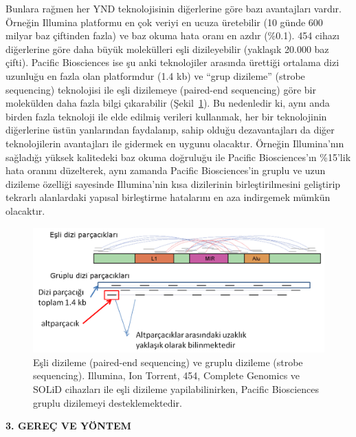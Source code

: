 \documentclass[11pt]{article}
\begin{document}
Bunlara rağmen her YND teknolojisinin diğerlerine göre bazı avantajları vardır. Örneğin Illumina platformu en çok veriyi en ucuza üretebilir (10 günde 600 milyar baz çiftinden fazla) ve baz okuma hata oranı en azdır (\%0.1). 454 cihazı diğerlerine göre daha büyük molekülleri eşli dizileyebilir (yaklaşık 20.000 baz çifti). Pacific Biosciences ise şu anki teknolojiler arasında ürettiği ortalama dizi uzunluğu en fazla olan platformdur (1.4 kb) ve ``grup dizileme'' (strobe sequencing) teknolojisi ile eşli dizilemeye (paired-end sequencing) göre bir molekülden daha fazla bilgi çıkarabilir (Şekil~\ref{fig:strobe}). Bu nedenledir ki, aynı anda birden fazla teknoloji ile elde edilmiş verileri kullanmak, her bir teknolojinin diğerlerine üstün yanlarından faydalanıp, sahip olduğu dezavantajları da diğer teknolojilerin avantajları ile gidermek en uygunu olacaktır. Örneğin Illumina'nın sağladığı yüksek kalitedeki baz okuma doğruluğu ile Pacific Biosciences'ın \%15'lik hata oranını düzelterek, aynı zamanda Pacific Biosciences'in gruplu ve uzun dizileme özelliği sayesinde Illumina'nin kısa dizilerinin birleştirilmesini geliştirip tekrarlı alanlardaki yapısal birleştirme hatalarını en aza indirgemek mümkün olacaktır.

\begin{figure}[htb]
\begin{center}
  \includegraphics[scale=0.75]{strobe.png}
\end{center}
\caption{Eşli dizileme (paired-end sequencing) ve gruplu dizileme (strobe sequencing). Illumina, Ion Torrent, 454, Complete Genomics ve SOLiD cihazları ile eşli dizileme yapilabilinirken, Pacific Biosciences gruplu dizilemeyi desteklemektedir.}
\label{fig:strobe}
\end{figure}



\clearpage


\begin{center}
{\bf \Large 3. GEREÇ VE YÖNTEM} 
\end{center}
\noindent
\end{document}
